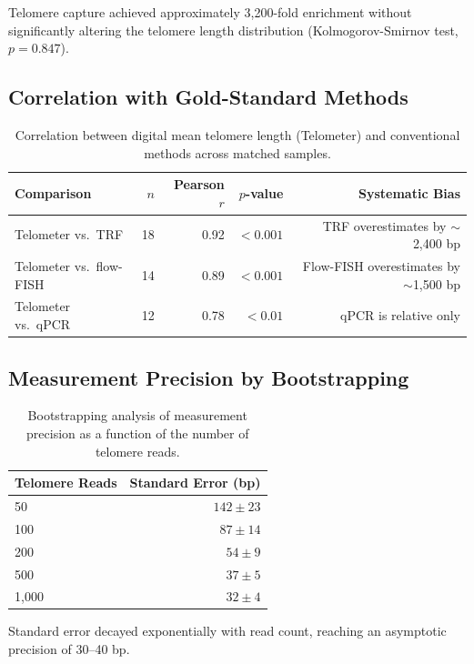 \documentclass[11pt]{article}
\begin{document}
Telomere capture achieved approximately 3,200-fold enrichment without significantly altering the telomere length distribution (Kolmogorov-Smirnov test, $p = 0.847$).

\subsection{Correlation with Gold-Standard Methods}

\begin{table}[H]
\centering
\caption{Correlation between digital mean telomere length (Telometer) and conventional methods across matched samples.}
\label{tab:validation}
\begin{tabular}{lrrrr}
\toprule
\textbf{Comparison} & \textbf{$n$} & \textbf{Pearson $r$} & \textbf{$p$-value} & \textbf{Systematic Bias} \\
\midrule
Telometer vs.\ TRF & 18 & 0.92 & $<0.001$ & TRF overestimates by $\sim$2,400 bp \\
Telometer vs.\ flow-FISH & 14 & 0.89 & $<0.001$ & Flow-FISH overestimates by $\sim$1,500 bp \\
Telometer vs.\ qPCR & 12 & 0.78 & $<0.01$ & qPCR is relative only \\
\bottomrule
\end{tabular}
\end{table}

\subsection{Measurement Precision by Bootstrapping}

\begin{table}[H]
\centering
\caption{Bootstrapping analysis of measurement precision as a function of the number of telomere reads.}
\label{tab:precision}
\begin{tabular}{lr}
\toprule
\textbf{Telomere Reads} & \textbf{Standard Error (bp)} \\
\midrule
50 & $142 \pm 23$ \\
100 & $87 \pm 14$ \\
200 & $54 \pm 9$ \\
500 & $37 \pm 5$ \\
1,000 & $32 \pm 4$ \\
\bottomrule
\end{tabular}
\end{table}

Standard error decayed exponentially with read count, reaching an asymptotic precision of 30--40 bp.
\end{document}
